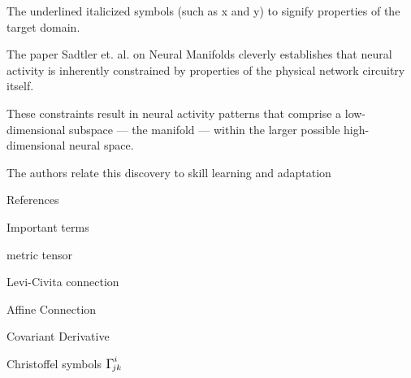 \documentclass{amsart}
\newcommand{\Christoffel}[2]{\ensuremath{{\mathlarger{\mathlarger\Gamma}}^{#1}\!\!\!_{#2}}}
\begin{document}
The underlined italicized symbols (such as x and y) to signify properties of the target domain.




The paper Sadtler et. al. on Neural Manifolds cleverly establishes that neural activity is inherently constrained by properties of the physical network circuitry itself.

These constraints result in neural activity patterns that comprise a low-dimensional subspace — the manifold — within the larger possible high-dimensional neural space.

The authors relate this discovery to skill learning and adaptation


\clearpage

References



\clearpage

Important terms

metric tensor

Levi-Civita connection

Affine Connection

Covariant Derivative

Christoffel symbols $ \Christoffel{i}{jk} $
\end{document}
